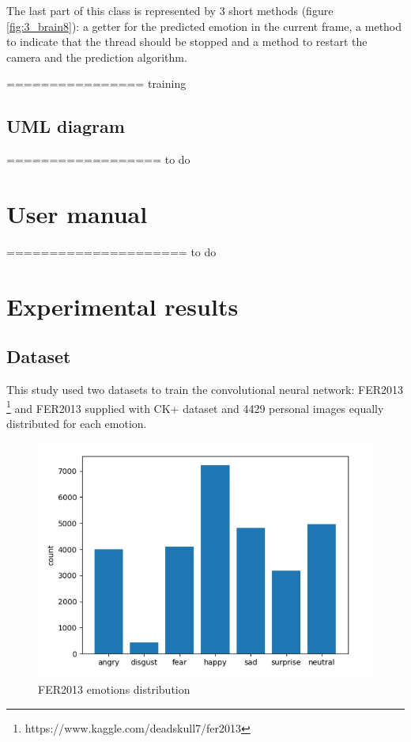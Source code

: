 \documentclass[runningheads,a4paper,12pt]{report}
\begin{document}
The last part of this class is represented by 3 short methods (figure \ref{fig:3_brain8}): a getter for the predicted emotion in the current frame, a method to indicate that the thread should be stopped and a method to restart the camera and the prediction algorithm.

================ training

\subsection*{UML diagram}

================== to do

\section{User manual}
\label{chapter:manual}
===================== to do

\section{Experimental results}
\label{chapter:results}

\subsection{Dataset}
\label{subsection:dataset}
This study used two datasets to train the convolutional neural network: FER2013 \footnote{https://www.kaggle.com/deadskull7/fer2013} and FER2013 supplied with CK+ dataset and 4429 personal images equally distributed for each emotion.

\begin{figure}[h]
	\centering
	\includegraphics[width=\linewidth]{./images/3_fer2013_distribution}\hfill	
	\caption{FER2013 emotions distribution}  
    \label{fig:distribution}
\end{figure}
\end{document}
